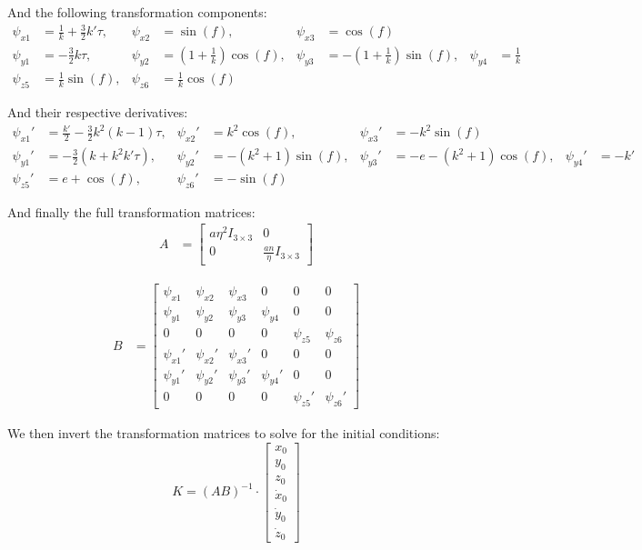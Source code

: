 And the following transformation components:
\begin{align*}
\psi_{x1} &= \frac{1}{k} + \frac{3}{2}k' \tau, &
\psi_{x2} &= \sin(f), &
\psi_{x3} &= \cos(f) \\
\psi_{y1} &= -\frac{3}{2}k\tau, &
\psi_{y2} &= \left(1 + \frac{1}{k}\right)\cos(f), &
\psi_{y3} &= -\left(1 + \frac{1}{k}\right)\sin(f), &
\psi_{y4} &= \frac{1}{k} \\
\psi_{z5} &= \frac{1}{k}\sin(f), &
\psi_{z6} &= \frac{1}{k}\cos(f)
\end{align*}

And their respective derivatives:
\begin{align*}
\psi_{x1}' &= \frac{k'}{2} - \frac{3}{2}k^2(k - 1)\tau, &
\psi_{x2}' &= k^2 \cos(f), &
\psi_{x3}' &= -k^2 \sin(f) \\
\psi_{y1}' &= -\frac{3}{2}\left(k + k^2k'\tau\right), &
\psi_{y2}' &= -(k^2 + 1)\sin(f), &
\psi_{y3}' &= -e - (k^2 + 1)\cos(f), &
\psi_{y4}' &= -k' \\
\psi_{z5}' &= e + \cos(f), &
\psi_{z6}' &= -\sin(f)
\end{align*}

And finally the full transformation matrices:
\begin{align*}
A &= 
\begin{bmatrix}
a\eta^2 I_{3 \times 3} & 0 \\
0 & \frac{a n}{\eta} I_{3 \times 3}
\end{bmatrix}
\end{align*}

\begin{align*}
B &=
\begin{bmatrix}
\psi_{x1} & \psi_{x2} & \psi_{x3} & 0 & 0 & 0 \\
\psi_{y1} & \psi_{y2} & \psi_{y3} & \psi_{y4} & 0 & 0 \\
0 & 0 & 0 & 0 & \psi_{z5} & \psi_{z6} \\
\psi_{x1}' & \psi_{x2}' & \psi_{x3}' & 0 & 0 & 0 \\
\psi_{y1}' & \psi_{y2}' & \psi_{y3}' & \psi_{y4}' & 0 & 0 \\
0 & 0 & 0 & 0 & \psi_{z5}' & \psi_{z6}'
\end{bmatrix}
\end{align*}

We then invert the transformation matrices to solve for the initial conditions:
\[
K = (A B)^{-1} \cdot \begin{bmatrix}
x_0 \\ y_0 \\ z_0 \\ \dot{x}_0 \\ \dot{y}_0 \\ \dot{z}_0
\end{bmatrix}
\]

